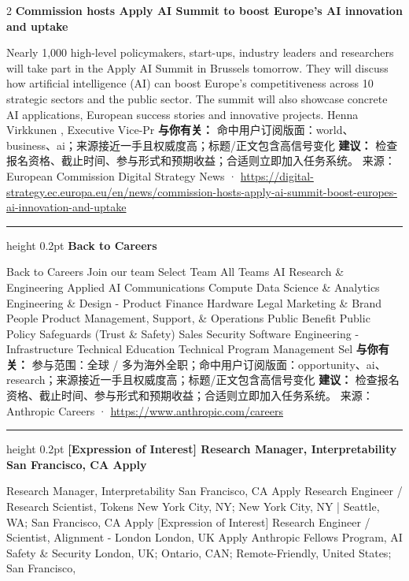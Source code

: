 \documentclass[10.5pt]{ctexart}
\begin{document}
\begin{multicols}{2}
{\large\bfseries Commission hosts Apply AI Summit to boost Europe’s AI innovation and uptake}\par
Nearly 1,000 high-level policymakers, start-ups, industry leaders and researchers will take part in the Apply AI Summit in Brussels tomorrow. They will discuss how artificial intelligence (AI) can boost Europe’s competitiveness across 10 strategic sectors and the public sector. The summit will also showcase concrete AI applications, European success stories and innovative projects. Henna Virkkunen , Executive Vice-Pr
\textbf{与你有关：} 命中用户订阅版面：world、business、ai；来源接近一手且权威度高；标题/正文包含高信号变化
\textbf{建议：} 检查报名资格、截止时间、参与形式和预期收益；合适则立即加入任务系统。
{\footnotesize\color{ormuted} 来源：European Commission Digital Strategy News · \url{https://digital-strategy.ec.europa.eu/en/news/commission-hosts-apply-ai-summit-boost-europes-ai-innovation-and-uptake}}
\vspace{2mm}
\hrule height 0.2pt
\vspace{2mm}
{\large\bfseries Back to Careers}\par
Back to Careers Join our team Select Team All Teams AI Research \& Engineering Applied AI Communications Compute Data Science \& Analytics Engineering \& Design - Product Finance Hardware Legal Marketing \& Brand People Product Management, Support, \& Operations Public Benefit Public Policy Safeguards (Trust \& Safety) Sales Security Software Engineering - Infrastructure Technical Education Technical Program Management Sel
\textbf{与你有关：} 参与范围：全球 / 多为海外全职；命中用户订阅版面：opportunity、ai、research；来源接近一手且权威度高；标题/正文包含高信号变化
\textbf{建议：} 检查报名资格、截止时间、参与形式和预期收益；合适则立即加入任务系统。
{\footnotesize\color{ormuted} 来源：Anthropic Careers · \url{https://www.anthropic.com/careers}}
\vspace{2mm}
\hrule height 0.2pt
\vspace{2mm}
{\large\bfseries [Expression of Interest] Research Manager, Interpretability San Francisco, CA Apply}\par
[Expression of Interest] Research Manager, Interpretability San Francisco, CA Apply Research Engineer / Research Scientist, Tokens New York City, NY; New York City, NY | Seattle, WA; San Francisco, CA Apply [Expression of Interest] Research Engineer / Scientist, Alignment - London London, UK Apply Anthropic Fellows Program, AI Safety \& Security London, UK; Ontario, CAN; Remote-Friendly, United States; San Francisco, 

\end{multicols}
\end{document}
